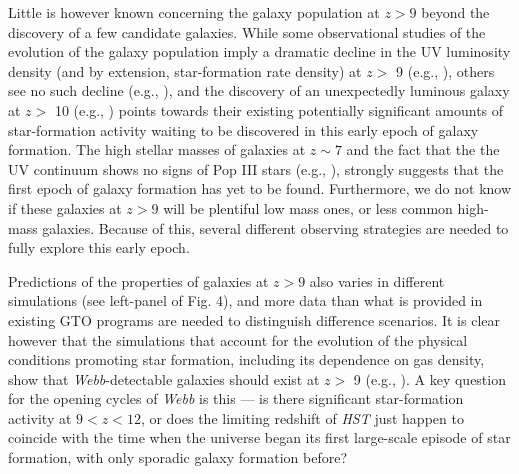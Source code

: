 \documentclass[12pt]{article}
\begin{document}
Little is however known concerning the galaxy population at $z > 9$ beyond the discovery of a few candidate galaxies.  While some observational studies of the evolution of the galaxy population imply a dramatic decline in the UV luminosity density (and by extension, star-formation rate density) at $z >$ 9 (e.g., \citealt{Bouwens2015b, Oesch2018}), others see no such decline (e.g., \citealt{Coe2013, McLeod2016}), and the discovery of an unexpectedly luminous galaxy at $z >$ 10 (e.g., \citealt{Oesch2016}) points towards their existing potentially significant amounts of star-formation activity waiting to be discovered in this early epoch of galaxy formation. The high stellar masses of galaxies at $z \sim 7$ and the fact that the the UV continuum shows no signs of Pop III stars (e.g., \citealt{Bhatawdekar2020}), strongly suggests that the first epoch of galaxy formation has yet to be found. Furthermore, we do not know if these galaxies at $z > 9$ will be plentiful low mass ones, or less common high-mass galaxies.  Because of this, several different observing strategies are needed to fully explore this early epoch.

Predictions of the properties of galaxies at $z > 9$ also varies in different simulations (see left-panel of Fig. 4), and more data than what is provided in existing GTO programs are needed to distinguish difference scenarios. It is clear however that the simulations that account for the evolution of the physical conditions promoting star formation, including its dependence on gas density, show that {\it Webb}-detectable galaxies should exist at $z >$ 9 (e.g., \citealt{Yung2019}).  A key question for the opening cycles of {\it Webb} is this — is there significant star-formation activity at  $9<z<12$, or does the limiting redshift of {\it HST} just happen to coincide with the time when the universe began its first large-scale episode of star formation, with only sporadic galaxy formation before?
\end{document}
